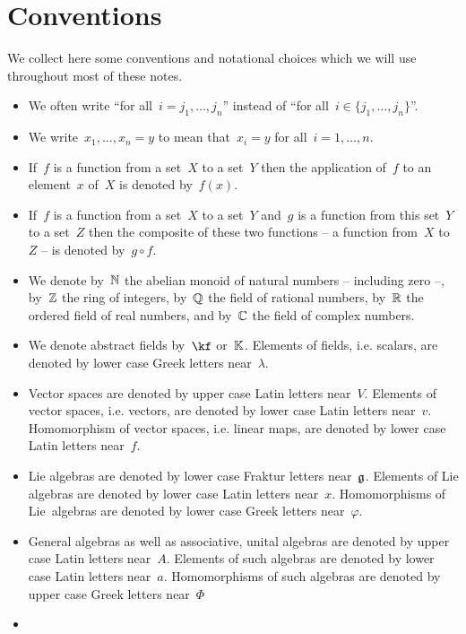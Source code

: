 \chapter{Conventions}

We collect here some conventions and notational choices which we will use throughout most of these notes.

\begin{itemize}
  \item
    We often write \enquote{for all~$i = j_1, \dotsc, j_n$} instead of \enquote{for all~$i \in \{ j_1, \dotsc, j_n \}$}.
  \item
    We write~$x_1, \dotsc, x_n = y$ to mean that~$x_i = y$ for all~$i = 1, \dotsc, n$.
  \item
    If~$f$ is a function from a set~$X$ to a set~$Y$ then the application of~$f$ to an element~$x$ of~$X$ is denoted by~$f(x)$.
  \item
    If~$f$ is a function from a set~$X$ to a set~$Y$ and~$g$ is a function from this set~$Y$ to a set~$Z$ then the composite of these two functions -- a function from~$X$ to~$Z$ -- is denoted by~$g \circ f$.
  \item
    We denote by~$\mathbb{N}$ the abelian monoid of natural numbers -- including zero --, by~$\mathbb{Z}$ the ring of integers, by~$\mathbb{Q}$ the field of rational numbers, by~$\mathbb{R}$ the ordered field of real numbers, and by~$\mathbb{C}$ the field of complex numbers.
  \item
    We denote abstract fields by~$\kf$ or~$\mathbb{K}$.
    Elements of fields, i.e. scalars, are denoted by lower case Greek letters near~$\lambda$.
  \item
    Vector spaces are denoted by upper case Latin letters near~$V$.
    Elements of vector spaces, i.e. vectors, are denoted by lower case Latin letters near~$v$.
    Homomorphism of vector spaces, i.e. linear maps, are denoted by lower case Latin letters near~$f$.
  \item
    Lie algebras are denoted by lower case Fraktur letters near~$\mathfrak{g}$.
    Elements of Lie algebras are denoted by lower case Latin letters near~$x$.
    Homomorphisms of Lie~algebras are denoted by lower case Greek letters near~$\varphi$.
  \item
    General algebras as well as associative, unital algebras are denoted by upper case Latin letters near~$A$.
    Elements of such algebras are denoted by lower case Latin letters near~$a$.
    Homomorphisms of such algebras are denoted by upper case Greek letters near~$\Phi$
  \item

\end{itemize}
